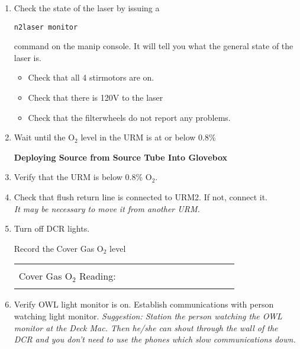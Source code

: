 \begin{enumerate}
\item\checkbox Check the state of the laser by issuing a 
\begin{verbatim}
n2laser monitor 
\end{verbatim}
command on the manip console. It will tell you what the general state of the laser is.
\begin{itemize}
\item\checkbox Check that all 4 stirmotors are on.
\item\checkbox Check that there is 120V to the laser
\item\checkbox Check that the filterwheels do not report any problems.
\end{itemize}

\item \checkbox Wait until the O$_2$ level in the URM is at or below 0.8\%



\begin{center}
            {\bf Deploying Source from Source Tube Into Glovebox}
\end{center}

 \item\checkbox Verify that the URM is below 0.8\% O$_2$.


\item\checkbox Check that flush return line is connected to
  URM2.  If not, connect it.\\
  \small
  {\em It may be necessary to move it from another URM.
  }
  \normalsize
  

 \item\checkbox Turn off DCR lights.

 \checkitem Record the Cover Gas O$_2$ level
     \begin{center}
     \begin{tabular}{|l|}
     \hline
      \\
     Cover Gas O$_2$ Reading:~~~~~~~~~~~~~~~~~~~~~~~~\\
      \\
     \hline
     \end{tabular}
     \end{center}

 \item\checkbox Verify OWL light monitor is on.  Establish communications
  with person watching light monitor.
  \small
  {\em
    Suggestion:  Station the person watching the OWL monitor at
    the Deck Mac.  Then he/she can shout through the  wall of the
    DCR and you don't need to use the phones which slow communications
    down.
  }
  \normalsize
 


\end{enumerate}

